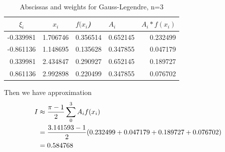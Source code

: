 \begin{table}[h]
\centering
\begin{tabular}{|r|r|r|r|r|}
\hline
\multicolumn{1}{|c|}{\textit{\textbf{\(\xi_i\)}}} & \multicolumn{1}{c|}{\textit{\textbf{\(x_i\)}}} & \multicolumn{1}{l|}{\textit{\(f(x_i\))}} & \multicolumn{1}{l|}{\textit{\(A_i\)}} & \multicolumn{1}{l|}{\textit{\(A_i*f(x_i)\)}} \\ \hline
-0.339981 & 1.706746 & 0.356514 & 0.652145 & 0.232499 \\ \hline
-0.861136 & 1.148695 & 0.135628 & 0.347855 & 0.047179 \\ \hline
0.339981 & 2.434847 & 0.290927 & 0.652145 & 0.189727 \\ \hline
0.861136 & 2.992898 & 0.220499 & 0.347855 & 0.076702 \\ \hline\end{tabular}
\caption{Abscissas and weights for Gauss-Legendre, n=3}
\label{tab-gauss-legendre-4-nodes}
\end{table}
Then we have approximation
\begin{align}
I&\approx\frac{\pi-1}{2} \sum_0^3 A_if(x_i) \notag \\
&=\frac{3.141593-1}{2} (0.232499+0.047179+0.189727+0.076702) \notag \\
&=0.584768 \notag
\end{align}



 